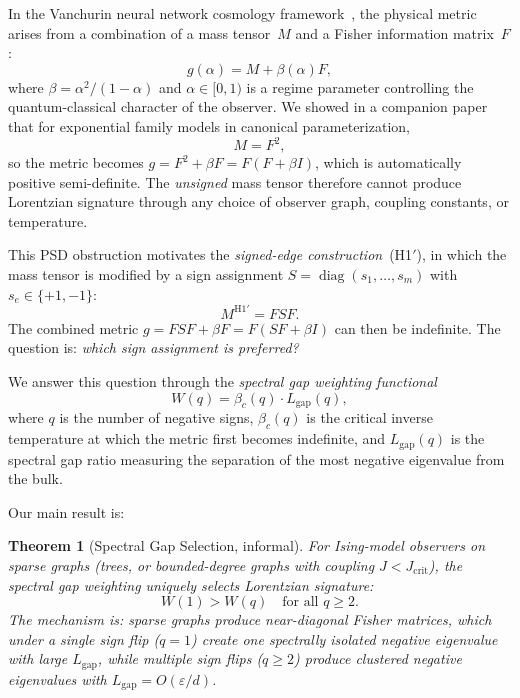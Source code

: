 \documentclass[11pt]{article}
\newtheorem{theorem}{Theorem}[section]
\theoremstyle{definition}
\theoremstyle{remark}
\begin{document}
In the Vanchurin neural network cosmology framework~\cite{Vanchurin2020,
Vanchurin2022}, the physical metric arises from a combination of a mass
tensor~$M$ and a Fisher information matrix~$F$:
\begin{equation}
  g(\alpha) = M + \beta(\alpha) F,
  \label{eq:type2-metric}
\end{equation}
where $\beta = \alpha^2 / (1 - \alpha)$ and $\alpha \in [0,1)$ is a regime
parameter controlling the quantum-classical character of the observer.
We showed in a companion paper~\cite{Paper1} that for exponential family
models in canonical parameterization,
\begin{equation}
  M = F^2,
  \label{eq:MF2}
\end{equation}
so the metric becomes $g = F^2 + \beta F = F(F + \beta I)$, which is
automatically positive semi-definite. The \emph{unsigned} mass tensor
therefore cannot produce Lorentzian signature through any choice of observer
graph, coupling constants, or temperature.

This PSD obstruction motivates the \emph{signed-edge construction}~(H1$'$),
in which the mass tensor is modified by a sign assignment
$S = \operatorname{diag}(s_1, \ldots, s_m)$ with $s_e \in \{+1, -1\}$:
\begin{equation}
  M^{\mathrm{H1}'} = F S F.
  \label{eq:signed-mass}
\end{equation}
The combined metric $g = FSF + \beta F = F(SF + \beta I)$ can then be
indefinite. The question is: \emph{which sign assignment is preferred?}

We answer this question through the \emph{spectral gap weighting
functional}
\begin{equation}
  W(q) = \beta_c(q) \cdot L_{\mathrm{gap}}(q),
  \label{eq:W-def}
\end{equation}
where $q$ is the number of negative signs, $\beta_c(q)$ is the critical
inverse temperature at which the metric first becomes indefinite, and
$L_{\mathrm{gap}}(q)$ is the spectral gap ratio measuring the separation
of the most negative eigenvalue from the bulk.

Our main result is:

\begin{theorem}[Spectral Gap Selection, informal]
\label{thm:main-informal}
For Ising-model observers on sparse graphs (trees, or bounded-degree graphs
with coupling $J < J_{\mathrm{crit}}$), the spectral gap weighting uniquely
selects Lorentzian signature:
\[
  W(1) > W(q) \quad \text{for all } q \geq 2.
\]
The mechanism is: sparse graphs produce near-diagonal Fisher matrices,
which under a single sign flip ($q = 1$) create one spectrally isolated
negative eigenvalue with large $L_{\mathrm{gap}}$, while multiple sign
flips ($q \geq 2$) produce clustered negative eigenvalues with
$L_{\mathrm{gap}} = O(\varepsilon/d)$.
\end{theorem}
\end{document}

